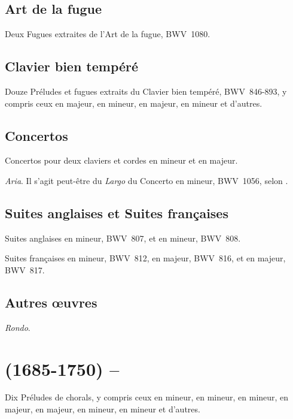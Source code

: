 \subsection{Art de la fugue}

Deux Fugues extraites de l'\hbox{Art} de la fugue, BWV~1080.

\subsection{Clavier bien tempéré}

Douze Préludes et fugues extraits du Clavier bien tempéré, BWV~846-893, y
compris ceux en \kG majeur, en \kG mineur, en \kB \Flat majeur, en \kB \Flat
mineur et d'autres.

\subsection{Concertos}

Concertos pour deux claviers et cordes en \kC mineur et en \kC majeur.

\emph{Aria}.
Il s'agit peut-être du \emph{Largo} du Concerto  en \kF mineur,
BWV~1056, selon \citet[p.~72, note~2]{White}.

\subsection{Suites anglaises et Suites françaises}

Suites anglaises  en \kA mineur, BWV~807, et  en \kG
mineur, BWV~808.

Suites françaises  en \kD mineur, BWV~812,  en \kG
majeur, BWV~816, et  en \kE majeur, BWV~817.

\subsection{Autres œuvres}

\emph{Rondo}.

\section[%
Johann Sebastian Bach (1685-1750) -- Ferruccio Busoni]{%
\JBach{} (1685-1750) -- \FBusoni{}}

Dix Préludes de chorals, y compris ceux en \kG mineur, en \kE \Flat mineur,
en \kF mineur, en \kC majeur, en \kG majeur, en \kA mineur, en \kD mineur et
d'autres.

